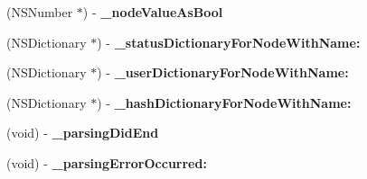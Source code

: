 \begin{DoxyCompactItemize}
\item 
\hypertarget{interface_m_g_twitter_lib_x_m_l_parser_a2e5c6df853ae2739331a30e5b36ae274}{
(\-N\-S\-Number $\ast$) -\/ {\bfseries \-\_\-node\-Value\-As\-Bool}}
\label{interface_m_g_twitter_lib_x_m_l_parser_a2e5c6df853ae2739331a30e5b36ae274}

\item 
\hypertarget{interface_m_g_twitter_lib_x_m_l_parser_aa84aae44373ad61c1f85e4a29efe079b}{
(\-N\-S\-Dictionary $\ast$) -\/ {\bfseries \-\_\-status\-Dictionary\-For\-Node\-With\-Name\-:}}
\label{interface_m_g_twitter_lib_x_m_l_parser_aa84aae44373ad61c1f85e4a29efe079b}

\item 
\hypertarget{interface_m_g_twitter_lib_x_m_l_parser_a3595d2b416e47f39ef9098724a8319cf}{
(\-N\-S\-Dictionary $\ast$) -\/ {\bfseries \-\_\-user\-Dictionary\-For\-Node\-With\-Name\-:}}
\label{interface_m_g_twitter_lib_x_m_l_parser_a3595d2b416e47f39ef9098724a8319cf}

\item 
\hypertarget{interface_m_g_twitter_lib_x_m_l_parser_aff1cbb6ad4febd7695040edf4e65d263}{
(\-N\-S\-Dictionary $\ast$) -\/ {\bfseries \-\_\-hash\-Dictionary\-For\-Node\-With\-Name\-:}}
\label{interface_m_g_twitter_lib_x_m_l_parser_aff1cbb6ad4febd7695040edf4e65d263}

\item 
\hypertarget{interface_m_g_twitter_lib_x_m_l_parser_a02eebd16b0614f05dc0039c370b6e69c}{
(void) -\/ {\bfseries \-\_\-parsing\-Did\-End}}
\label{interface_m_g_twitter_lib_x_m_l_parser_a02eebd16b0614f05dc0039c370b6e69c}

\item 
\hypertarget{interface_m_g_twitter_lib_x_m_l_parser_a9f2db40c3543e2e02f095d8af1a4001a}{
(void) -\/ {\bfseries \-\_\-parsing\-Error\-Occurred\-:}}
\label{interface_m_g_twitter_lib_x_m_l_parser_a9f2db40c3543e2e02f095d8af1a4001a}

\end{DoxyCompactItemize}
